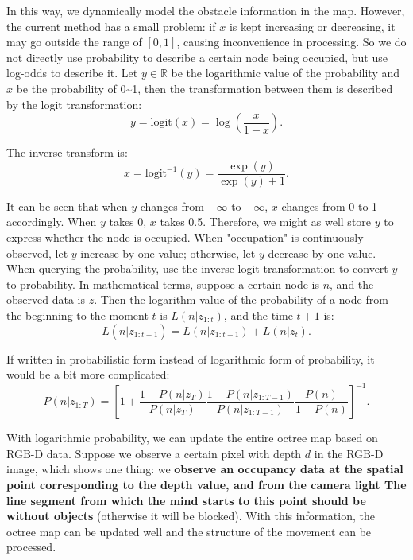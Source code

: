 In this way, we dynamically model the obstacle information in the map. However, the current method has a small problem: if $x$ is kept increasing or decreasing, it may go outside the range of $[0,1]$, causing inconvenience in processing. So we do not directly use probability to describe a certain node being occupied, but use log-odds to describe it. Let $y \in \mathbb{R}$ be the logarithmic value of the probability and $x$ be the probability of 0\textasciitilde1, then the transformation between them is described by the logit transformation:
\begin{equation}
	y = \mathrm{logit}(x) = \log \left( \frac{x}{1-x} \right).
\end{equation}

The inverse transform is:
\begin{equation}
	x = \mathrm{logit}^{-1}(y) = \frac{\exp(y)}{\exp(y)+1}.
\end{equation}

It can be seen that when $y$ changes from $-\infty$ to $+\infty$, $x$ changes from 0 to 1 accordingly. When $y$ takes 0, $x$ takes 0.5. Therefore, we might as well store $y$ to express whether the node is occupied. When "occupation" is continuously observed, let $y$ increase by one value; otherwise, let $y$ decrease by one value. When querying the probability, use the inverse logit transformation to convert $y$ to probability. In mathematical terms, suppose a certain node is $n$, and the observed data is $z$. Then the logarithm value of the probability of a node from the beginning to the moment $t$ is $L(n|z_{1:t})$, and the time $t+1$ is:
\begin{equation}
	L(n|z_{1:t+1}) = L(n|z_{1:t-1}) + L(n|z_{t}).
\end{equation}

If written in probabilistic form instead of logarithmic form of probability, it would be a bit more complicated:
\begin{equation}
	P(n|z_{1:T}) =  \left[ 1+ \frac{1-P(n|z_T)}{P(n|z_T)} \frac{1-P(n|z_{1:T-1})}{P(n|z_{1:T-1})} \frac{P(n)}{1-P(n)} \right]^{-1}.
\end{equation}

With logarithmic probability, we can update the entire octree map based on RGB-D data. Suppose we observe a certain pixel with depth $d$ in the RGB-D image, which shows one thing: we \textbf{ observe an occupancy data at the spatial point corresponding to the depth value, and from the camera light The line segment from which the mind starts to this point should be without objects} (otherwise it will be blocked). With this information, the octree map can be updated well and the structure of the movement can be processed.

